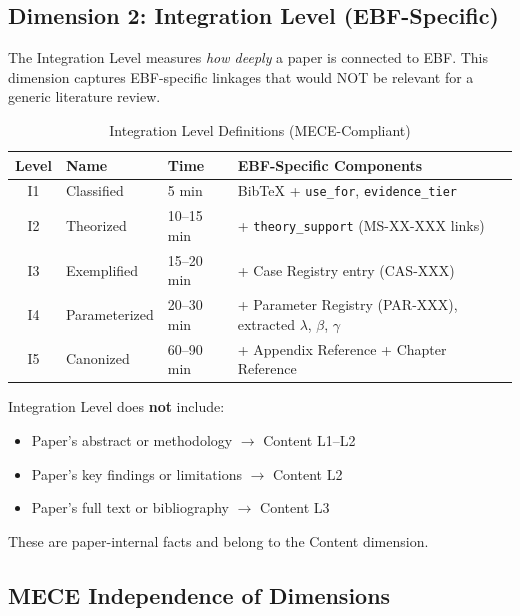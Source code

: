 \subsection{Dimension 2: Integration Level (EBF-Specific)}

The Integration Level measures \textit{how deeply} a paper is connected to EBF.
This dimension captures EBF-specific linkages that would NOT be relevant for a generic literature review.

\begin{table}[htbp]
\centering
\caption{Integration Level Definitions (MECE-Compliant)}
\label{tab:integration-levels}
\renewcommand{\arraystretch}{1.3}
\begin{tabular}{@{}cllp{5.5cm}@{}}
\toprule
\textbf{Level} & \textbf{Name} & \textbf{Time} & \textbf{EBF-Specific Components} \\
\midrule
I1 & Classified & 5 min & BibTeX + \texttt{use\_for}, \texttt{evidence\_tier} \\
I2 & Theorized & 10--15 min & + \texttt{theory\_support} (MS-XX-XXX links) \\
I3 & Exemplified & 15--20 min & + Case Registry entry (CAS-XXX) \\
I4 & Parameterized & 20--30 min & + Parameter Registry (PAR-XXX), extracted $\lambda$, $\beta$, $\gamma$ \\
I5 & Canonized & 60--90 min & + Appendix Reference + Chapter Reference \\
\bottomrule
\end{tabular}
\end{table}

\begin{tcolorbox}[colback=yellow!5!white, colframe=yellow!75!black,
    title=Note: What Integration Level Does NOT Include]
Integration Level does \textbf{not} include:
\begin{itemize}[nosep]
    \item Paper's abstract or methodology $\rightarrow$ Content L1--L2
    \item Paper's key findings or limitations $\rightarrow$ Content L2
    \item Paper's full text or bibliography $\rightarrow$ Content L3
\end{itemize}
These are paper-internal facts and belong to the Content dimension.
\end{tcolorbox}

\subsection{MECE Independence of Dimensions}

